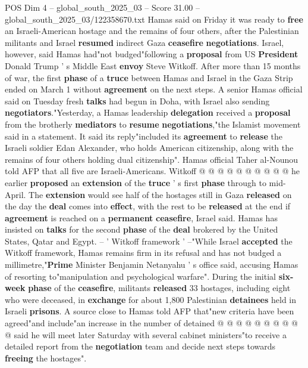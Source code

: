 \begin{textsample}{POS Dim 4 – global\_south\_2025\_03 – Score 31.00 – global\_south\_2025\_03/122358670.txt}  \label{ex:f4_pos_035}
Hamas said on Friday it was ready to \textbf{free} an Israeli-American hostage and the remains of four others, after the Palestinian militants and Israel \textbf{resumed} indirect Gaza \textbf{ceasefire} \textbf{negotiations}.
Israel, however, said Hamas had"not budged"following a \textbf{proposal} from US \textbf{President} Donald Trump ' s Middle East \textbf{envoy} Steve Witkoff.
After more than 15 months of war, the first \textbf{phase} of a \textbf{truce} between Hamas and Israel in the Gaza Strip ended on March 1 without \textbf{agreement} on the next steps.
A senior Hamas official said on Tuesday fresh \textbf{talks} had begun in Doha, with Israel also sending \textbf{negotiators}."Yesterday, a Hamas leadership \textbf{delegation} received a \textbf{proposal} from the brotherly \textbf{mediators} to \textbf{resume} \textbf{negotiations},"the Islamist movement said in a statement.
It said its reply"included its \textbf{agreement} to \textbf{release} the Israeli soldier Edan Alexander, who holds American citizenship, along with the remains of four others holding dual citizenship".
Hamas official Taher al-Nounou told AFP that all five are Israeli-Americans.
Witkoff @ @ @ @ @ @ @ @ @ @ he earlier \textbf{proposed} an \textbf{extension} of the \textbf{truce} ' s first \textbf{phase} through to mid-April.
The \textbf{extension} would see half of the hostages still in Gaza \textbf{released} on the day the \textbf{deal} comes into \textbf{effect}, with the rest to be \textbf{released} at the end if \textbf{agreement} is reached on a \textbf{permanent} \textbf{ceasefire}, Israel said.
Hamas has insisted on \textbf{talks} for the second \textbf{phase} of the \textbf{deal} brokered by the United States, Qatar and Egypt. -- ' Witkoff framework ' --"While Israel \textbf{accepted} the Witkoff framework, Hamas remains firm in its refusal and has not budged a millimetre,"\textbf{Prime} Minister Benjamin Netanyahu ' s office said, accusing Hamas of resorting to"manipulation and psychological warfare".
During the initial \textbf{six-week} \textbf{phase} of the \textbf{ceasefire}, militants \textbf{released} 33 hostages, including eight who were deceased, in \textbf{exchange} for about 1,800 Palestinian \textbf{detainees} held in Israeli \textbf{prisons}.
A source close to Hamas told AFP that"new criteria have been agreed"and include"an increase in the number of detained @ @ @ @ @ @ @ @ @ @ said he will meet later Saturday with several cabinet ministers"to receive a detailed report from the \textbf{negotiation} team and decide next steps towards \textbf{freeing} the hostages".

\end{textsample}
